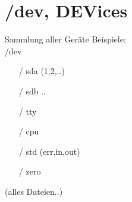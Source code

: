 \section[/dev]{/dev, DEVices}
\begin{frame}{Sammlung aller Geräte}
Beispiele:\\
/dev
\begin{itemize}
 \item [/] sda (1,2,..)
 \item [/] sdb ..
 \item [/] tty
 \item [/] cpu
 \item [/] std (err,in,out)
 \item [/] zero
\end{itemize}
(alles Dateien..)
\end{frame}

